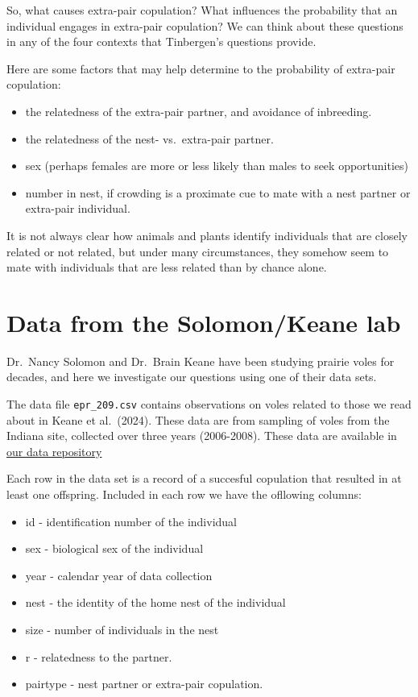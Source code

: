 \documentclass[
  letterpaper,
  DIV=11,
  numbers=noendperiod]{scrreprt}
\providecommand{\tightlist}{%
  \setlength{\itemsep}{0pt}\setlength{\parskip}{0pt}}
\begin{document}
So, what causes extra-pair copulation? What influences the probability
that an individual engages in extra-pair copulation? We can think about
these questions in any of the four contexts that Tinbergen's questions
provide.

Here are some factors that may help determine to the probability of
extra-pair copulation:

\begin{itemize}
\tightlist
\item
  the relatedness of the extra-pair partner, and avoidance of
  inbreeding.
\item
  the relatedness of the nest- vs.~extra-pair partner.
\item
  sex (perhaps females are more or less likely than males to seek
  opportunities)
\item
  number in nest, if crowding is a proximate cue to mate with a nest
  partner or extra-pair individual.
\end{itemize}

It is not always clear how animals and plants identify individuals that
are closely related or not related, but under many circumstances, they
somehow seem to mate with individuals that are less related than by
chance alone.

\section{Data from the Solomon/Keane
lab}\label{data-from-the-solomonkeane-lab}

Dr.~Nancy Solomon and Dr.~Brain Keane have been studying prairie voles
for decades, and here we investigate our questions using one of their
data sets.

The data file \texttt{epr\_209.csv} contains observations on voles
related to those we read about in Keane et al.~(2024). These data are
from sampling of voles from the Indiana site, collected over three years
(2006-2008). These data are available in
\href{https://drive.google.com/drive/folders/1FR2FLiW3xyD4Er52YzVTToPZuXXReGRo?usp=sharing}{our
data repository}

Each row in the data set is a record of a succesful copulation that
resulted in at least one offspring. Included in each row we have the
ofllowing columns:

\begin{itemize}
\tightlist
\item
  id - identification number of the individual
\item
  sex - biological sex of the individual
\item
  year - calendar year of data collection
\item
  nest - the identity of the home nest of the individual
\item
  size - number of individuals in the nest
\item
  r - relatedness to the partner.
\item
  pairtype - nest partner or extra-pair copulation.
\end{itemize}
\end{document}
